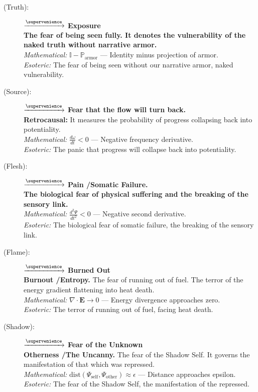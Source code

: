\begin{description}
    \item[(Truth):] \velhrah $\xrightarrow{\supervenience}$ \textbf{Exposure} \\
    \textbf{The fear of being seen fully. It denotes the vulnerability of the naked truth without narrative armor.} \\
    \textit{Mathematical:} $\mathbb{I} - \mathbb{P}_{\text{armor}}$ — Identity minus projection of armor. \\
    \textit{Esoteric:} The fear of being seen without our narrative armor, naked vulnerability.

    \item[(Source):] \sorvey $\xrightarrow{\supervenience}$ \textbf{Fear that the flow will turn back.} \\
    \textbf{Retrocausal:} It measures the probability of progress collapsing back into potentiality. \\
    \textit{Mathematical:} $\frac{d\omega}{dt} < 0$ — Negative frequency derivative. \\
    \textit{Esoteric:} The panic that progress will collapse back into potentiality.

    \item[(Flesh):] \kothmet $\xrightarrow{\supervenience}$ \textbf{Pain \slash Somatic Failure.} \\
    \textbf{The biological fear of physical suffering and the breaking of the sensory link.} \\
    \textit{Mathematical:} $\frac{d^2\Psi}{dt^2} < 0$ — Negative second derivative. \\
    \textit{Esoteric:} The biological fear of somatic failure, the breaking of the sensory link.

    \item[(Flame):] \drehrim $\xrightarrow{\supervenience}$ \textbf{Burned Out} \\
    \textbf{Burnout \slash Entropy.} The fear of running out of fuel. The terror of the energy gradient flattening into heat death. \\
    \textit{Mathematical:} $\nabla \cdot \mathbf{E} \to 0$ — Energy divergence approaches zero. \\
    \textit{Esoteric:} The terror of running out of fuel, facing heat death.

    \item[(Shadow):] \rheaandh $\xrightarrow{\supervenience}$ \textbf{Fear of the Unknown} \\
    \textbf{Otherness \slash The Uncanny.} The fear of the Shadow Self. It governs the manifestation of that which was repressed. \\
    \textit{Mathematical:} $\text{dist}(\Psi_{\text{self}}, \Psi_{\text{other}}) \approx \epsilon$ — Distance approaches epsilon. \\
    \textit{Esoteric:} The fear of the Shadow Self, the manifestation of the repressed.


\end{description}
